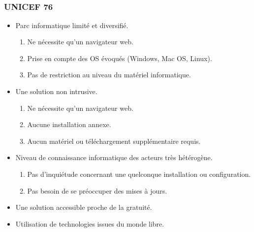 \subsection{} %

\begin{frame}
  \frametitle{UNICEF 76}
  \begin{itemize}
    \item Parc informatique limité et diversifié.
      \begin{enumerate}
        \item Ne nécessite qu'un navigateur web.
        \item Prise en compte des OS évoqués (Windows, Mac OS, Linux).
        \item Pas de restriction au niveau du matériel informatique.
      \end{enumerate}
    \item Une solution non intrusive.
      \begin{enumerate}
        \item Ne nécessite qu'un navigateur web.
        \item Aucune installation annexe.
        \item Aucun matériel ou téléchargement supplémentaire requis.
      \end{enumerate}
    \item Niveau de connaissance informatique des acteurs très hétérogène.
      \begin{enumerate}
        \item Pas d'inquiétude concernant une quelconque installation ou configuration.
        \item Pas besoin de se préoccuper des mises à jours.  
      \end{enumerate}
    \item Une solution accessible proche de la gratuité.
    \item Utilisation de technologies issues du monde libre.
  \end{itemize}
\end{frame}

\subsection{}


\speaker{\matthieu}
\subsection{}


